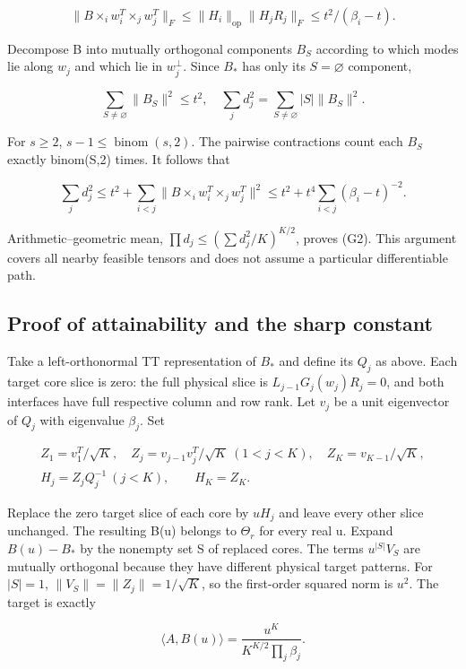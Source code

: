 \documentclass[
  11pt,
]{article}
\begin{document}
\[
 \|B\times_iw_i^T\times_jw_j^T\|_F
 \le\|H_i\|_{\mathrm{op}}\|H_jR_j\|_F
 \le t^2/(\beta_i-t).
\]

Decompose B into mutually orthogonal components \(B_S\) according to
which modes lie along \(w_j\) and which lie in \(w_j^\perp\). Since
\(B_*\) has only its \(S=\varnothing\) component,

\[
 \sum_{S\ne\varnothing}\|B_S\|^2\le t^2,
 \quad \sum_jd_j^2=\sum_{S\ne\varnothing}|S|\|B_S\|^2.
\]

For \(s\ge 2\), \(s-1\le \operatorname{binom}(s,2)\). The pairwise
contractions count each \(B_S\) exactly binom(\textbar S\textbar,2)
times. It follows that

\[
 \sum_jd_j^2\le t^2+
 \sum_{i<j}\|B\times_iw_i^T\times_jw_j^T\|^2
 \le t^2+t^4\sum_{i<j}(\beta_i-t)^{-2}.
\]

Arithmetic--geometric mean, \(\prod d_j\le (\sum d_j^{2}/K)^{K/2}\),
proves (G2). This argument covers all nearby feasible tensors and does
not assume a particular differentiable path.

\subsection{Proof of attainability and the sharp
constant}\label{proof-of-attainability-and-the-sharp-constant}

Take a left-orthonormal TT representation of \(B_*\) and define its
\(Q_j\) as above. Each target core slice is zero: the full physical
slice is \(L_{j-1}G_j(w_j)R_j=0\), and both interfaces have full
respective column and row rank. Let \(v_j\) be a unit eigenvector of
\(Q_j\) with eigenvalue \(\beta _j\). Set

\[
 \begin{gathered}
 Z_1=v_1^T/\sqrt K,\quad
 Z_j=v_{j-1}v_j^T/\sqrt K\ (1<j<K),\quad
 Z_K=v_{K-1}/\sqrt K,\\
 H_j=Z_jQ_j^{-1}\ (j<K),\qquad H_K=Z_K.
 \end{gathered}
\]

Replace the zero target slice of each core by \(uH_j\) and leave every
other slice unchanged. The resulting B(u) belongs to \(\Theta _r\) for
every real u. Expand \(B(u)-B_*\) by the nonempty set S of replaced
cores. The terms \(u^{|S|}V_S\) are mutually orthogonal because they
have different physical target patterns. For \(|S|=1\),
\(\|V_S\|=\|Z_j\|=1/\sqrt{K}\), so the first-order squared norm is
\(u^{2}\). The target is exactly

\[
 \langle A,B(u)\rangle
 =\frac{u^K}{K^{K/2}\prod_j\beta_j}.
\]
\end{document}
